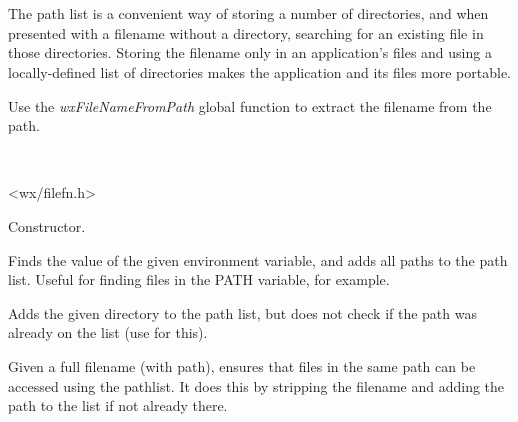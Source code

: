 \section{}\label{wxpathlist}

The path list is a convenient way of storing a number of directories, and
when presented with a filename without a directory, searching for an existing file
in those directories.  Storing the filename only in an application's files and
using a locally-defined list of directories makes the application and its files more
portable.

Use the {\it wxFileNameFromPath} global function to extract the filename
from the path.


\\


<wx/filefn.h>





\label{wxpathlistctor}


Constructor.


\label{wxpathlistaddenvlist}


Finds the value of the given environment variable, and adds all paths
to the path list. Useful for finding files in the PATH variable, for
example.


\label{wxpathlistadd}


Adds the given directory to the path list, but does not
check if the path was already on the list (use 
 for this).


\label{wxpathlistensurefileaccessible}


Given a full filename (with path), ensures that files in the same path
can be accessed using the pathlist. It does this by stripping the
filename and adding the path to the list if not already there.


